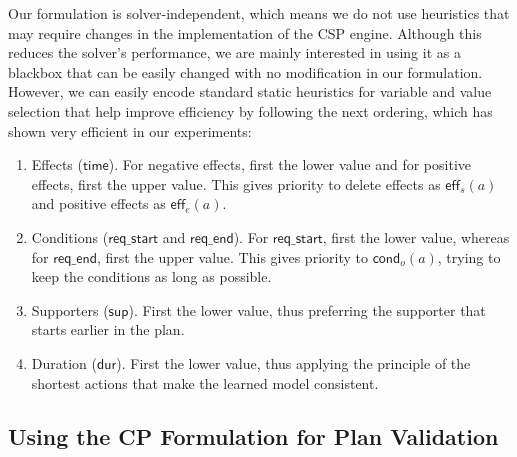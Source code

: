 \documentclass[10pt,journal,compsoc]{IEEEtran}
\newcommand{\eff}{\mathsf{eff}}    %
\newcommand{\cond}{\mathsf{cond}}  %
\newcommand{\dur}{\mathsf{dur}}    %
\newcommand{\supp}{\mathsf{sup}}   %
\newcommand{\tim}{\mathsf{time}}   %
\newcommand{\reqs}{\mathsf{req\_{start}}} %
\newcommand{\reqe}{\mathsf{req\_{end}}}   %
\begin{document}
Our formulation is solver-independent, which means we do not use heuristics that may require changes in the implementation of the CSP engine.
Although this reduces the solver's performance, we are mainly interested in using it as a blackbox that can be easily changed with no modification in our formulation. However, we can easily encode standard static heuristics for variable and value selection that help improve efficiency by following the next ordering, which has shown very efficient in our experiments:



\begin{enumerate}
	\item Effects ($\tim$). For negative effects, first the lower value and for positive effects, first the upper value. This gives priority to delete effects as $\eff_s(a)$ and positive effects as $\eff_e(a)$.
	\item Conditions ($\reqs$ and $\reqe$). For $\reqs$, first the lower value, whereas for $\reqe$, first the upper value. This gives priority to $\cond_o(a)$, trying to keep the conditions as long as possible.
	\item Supporters ($\supp$). First the lower value, thus preferring the supporter that starts earlier in the plan.
	\item Duration ($\dur$). First the lower value, thus applying the principle of the shortest actions that make the learned model consistent.
\end{enumerate}




\subsection{Using the CP Formulation for Plan Validation}
\label{sec:usingCPValidation}
\end{document}
